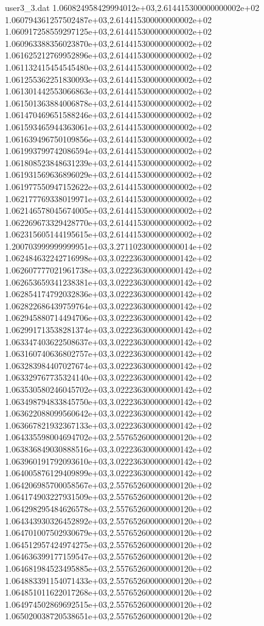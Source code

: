 \begin{filecontents}{user3_3.dat}
1.060824958429994012e+03,2.614415300000000002e+02
1.060794361257502487e+03,2.614415300000000002e+02
1.060917258559297125e+03,2.614415300000000002e+02
1.060963388356023870e+03,2.614415300000000002e+02
1.061625212769952896e+03,2.614415300000000002e+02
1.061132415454545480e+03,2.614415300000000002e+02
1.061255362251830093e+03,2.614415300000000002e+02
1.061301442553066863e+03,2.614415300000000002e+02
1.061501363884006878e+03,2.614415300000000002e+02
1.061470469651588246e+03,2.614415300000000002e+02
1.061593465944363061e+03,2.614415300000000002e+02
1.061639496750109856e+03,2.614415300000000002e+02
1.061993799742086594e+03,2.614415300000000002e+02
1.061808523848631239e+03,2.614415300000000002e+02
1.061931569636896029e+03,2.614415300000000002e+02
1.061977550947152622e+03,2.614415300000000002e+02
1.062177769338019971e+03,2.614415300000000002e+02
1.062146578045674005e+03,2.614415300000000002e+02
1.062269673329428770e+03,2.614415300000000002e+02
1.062315605144195615e+03,2.614415300000000002e+02
1.200703999999999951e+03,3.271102300000000014e+02
1.062484632242716998e+03,3.022236300000000142e+02
1.062607777021961738e+03,3.022236300000000142e+02
1.062653659341238381e+03,3.022236300000000142e+02
1.062854174792032836e+03,3.022236300000000142e+02
1.062822686439759764e+03,3.022236300000000142e+02
1.062945880714494706e+03,3.022236300000000142e+02
1.062991713538281374e+03,3.022236300000000142e+02
1.063347403622508637e+03,3.022236300000000142e+02
1.063160740636802757e+03,3.022236300000000142e+02
1.063283984407027674e+03,3.022236300000000142e+02
1.063329767735324140e+03,3.022236300000000142e+02
1.063530580246045702e+03,3.022236300000000142e+02
1.063498794833845750e+03,3.022236300000000142e+02
1.063622088099560642e+03,3.022236300000000142e+02
1.063667821932367133e+03,3.022236300000000142e+02
1.064335598004694702e+03,2.557652600000000120e+02
1.063836849030888516e+03,3.022236300000000142e+02
1.063960191792093610e+03,3.022236300000000142e+02
1.064005876129409899e+03,3.022236300000000142e+02
1.064206985700058567e+03,2.557652600000000120e+02
1.064174903227931509e+03,2.557652600000000120e+02
1.064298295484626578e+03,2.557652600000000120e+02
1.064343930326452892e+03,2.557652600000000120e+02
1.064701007502930679e+03,2.557652600000000120e+02
1.064512957424974275e+03,2.557652600000000120e+02
1.064636399177159547e+03,2.557652600000000120e+02
1.064681984523495885e+03,2.557652600000000120e+02
1.064883391154071433e+03,2.557652600000000120e+02
1.064851011622017268e+03,2.557652600000000120e+02
1.064974502869692515e+03,2.557652600000000120e+02
1.065020038720538651e+03,2.557652600000000120e+02

\end{filecontents}
